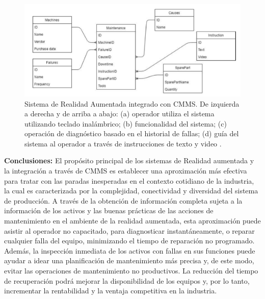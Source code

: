 \begin{description}
\begin{figure}[H]
\centering
\includegraphics[scale=0.7]{images/arsystem.png}
\caption{Sistema de Realidad Aumentada integrado con CMMS. De izquierda a derecha y de arriba a abajo: (a) operador utiliza el sistema utilizando teclado inalámbrico; (b) funcionalidad del sistema; (c) operación de diagnóstico basado en el historial de fallas; (d) guía del sistema al operador a través de instrucciones de texto y video \citep{aransyash2019}.}
\end{figure} 
\end{description}

\begin{description}
\item \textbf{Conclusiones:} El propósito principal de los sistemas de Realidad aumentada y la integración a través de CMMS es establecer una aproximación más efectiva para tratar con las paradas inesperadas en el contexto cotidiano de la industria, la cual es caracterizada por la complejidad, conectividad y diversidad del sistema de producción. A través de la obtención de información completa sujeta a la información de los activos y las buenas prácticas de las acciones de mantenimiento en el ambiente de la realidad aumentada, esta aproximación puede asistir al operador no capacitado, para diagnosticar instantáneamente, o reparar cualquier falla del equipo, minimizando el tiempo de reparación no programado. Además, la inspección inmediata de los activos con fallas en sus funciones puede ayudar a idear una planificación de mantenimiento más precisa y, de este modo, evitar las operaciones de mantenimiento no productivos. La reducción del tiempo de recuperación podrá mejorar la disponibilidad de los equipos y, por lo tanto, incrementar la rentabilidad y la ventaja competitiva en la industria.
\end{description}
